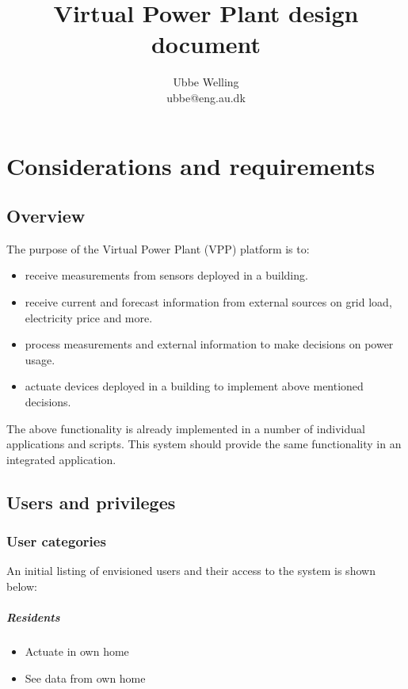 \documentclass{report}
\begin{document}
\title{Virtual Power Plant design document}
\author{Ubbe Welling\\ubbe@eng.au.dk}

\maketitle

\setcounter{tocdepth}{2}
\tableofcontents

\chapter{Considerations and requirements}

\section{Overview}

The purpose of the Virtual Power Plant (VPP) platform is to:
\begin{itemize}
	\item receive measurements from sensors deployed in a building.
	\item receive current and forecast information from external sources on grid load, electricity price and more.
	\item process measurements and external information to make decisions on power usage.
	\item actuate devices deployed in a building to implement above mentioned decisions.
\end{itemize} 
The above functionality is already implemented in a number of individual applications and scripts. This system should provide the same functionality in an integrated application.

\section{Users and privileges}

\subsection{User categories}
An initial listing of envisioned users and their access to the system is shown below:

\paragraph{Residents}
\begin{itemize}
    \item{Actuate in own home}
    \item{See data from own home}
\end{itemize}
\end{document}
